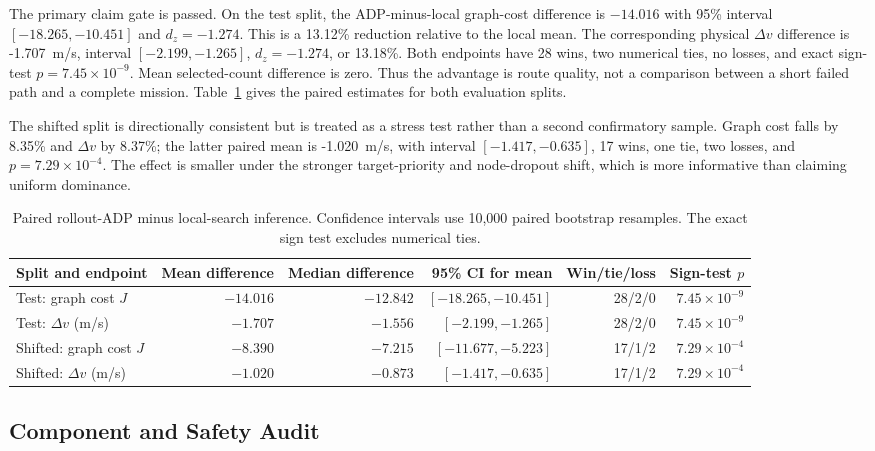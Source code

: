\documentclass{IEEEtaes}
\newcommand{\unit}[2]{#1~#2}
\theoremstyle{remark}
\theoremstyle{plain}
\begin{document}
The primary claim gate is passed. On the test split, the ADP-minus-local graph-cost difference is $-14.016$ with 95\% interval $[-18.265,-10.451]$ and $d_z=-1.274$. This is a 13.12\% reduction relative to the local mean. The corresponding physical $\Delta v$ difference is \unit{-1.707}{m/s}, interval $[-2.199,-1.265]$, $d_z=-1.274$, or 13.18\%. Both endpoints have 28 wins, two numerical ties, no losses, and exact sign-test $p=7.45\times10^{-9}$. Mean selected-count difference is zero. Thus the advantage is route quality, not a comparison between a short failed path and a complete mission. Table~\ref{tab:paired-inference} gives the paired estimates for both evaluation splits.

The shifted split is directionally consistent but is treated as a stress test rather than a second confirmatory sample. Graph cost falls by 8.35\% and $\Delta v$ by 8.37\%; the latter paired mean is \unit{-1.020}{m/s}, with interval $[-1.417,-0.635]$, 17 wins, one tie, two losses, and $p=7.29\times10^{-4}$. The effect is smaller under the stronger target-priority and node-dropout shift, which is more informative than claiming uniform dominance.

\begin{table}[t]
  \centering
  \caption{Paired rollout-ADP minus local-search inference. Confidence intervals use 10,000 paired bootstrap resamples. The exact sign test excludes numerical ties.}
  \label{tab:paired-inference}
  \renewcommand{\arraystretch}{1.06}
  \setlength{\tabcolsep}{5pt}
  \footnotesize
  \begin{tabular}{@{}lrrrrr@{}}
    \toprule
    Split and endpoint & Mean difference & Median difference & 95\% CI for mean & Win/tie/loss & Sign-test $p$ \\
    \midrule
    Test: graph cost $J$ & $-14.016$ & $-12.842$ & $[-18.265,-10.451]$ & 28/2/0 & $7.45\times10^{-9}$ \\
    Test: $\Delta v$ (m/s) & $-1.707$ & $-1.556$ & $[-2.199,-1.265]$ & 28/2/0 & $7.45\times10^{-9}$ \\
    Shifted: graph cost $J$ & $-8.390$ & $-7.215$ & $[-11.677,-5.223]$ & 17/1/2 & $7.29\times10^{-4}$ \\
    Shifted: $\Delta v$ (m/s) & $-1.020$ & $-0.873$ & $[-1.417,-0.635]$ & 17/1/2 & $7.29\times10^{-4}$ \\
    \bottomrule
  \end{tabular}
\end{table}

\subsection{Component and Safety Audit}
\end{document}
